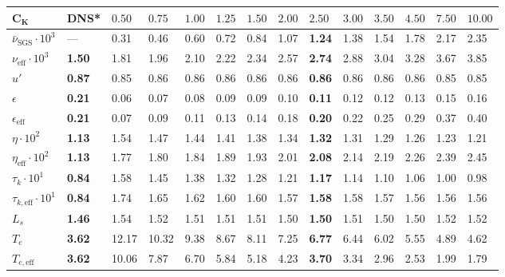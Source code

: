 \documentclass{pracamgren}
\begin{document}
\begin{table}[ht]
\centering
\scriptsize
\begin{tabular}{llllllllllllll}
$\mathbf{C_K}$ & \textbf{DNS}* & $0.50$ & $0.75$ & $1.00$ & $1.25$ & $1.50$ & $2.00$ & $\mathbf{2.50}$ & $3.00$ & $3.50$ & $4.50$ & $7.50$ & $10.00$ \\ \hline

$\bar{\nu}_{\text{SGS}} \cdot 10^3$ & --- & 0.31 & 0.46 & 0.60 & 0.72 & 0.84 & 1.07 & \textbf{1.24} & 1.38 & 1.54 & 1.78 & 2.17 & 2.35 \\
$\nu_{\text{eff}}  \cdot 10^3$ & \textbf{1.50} & 1.81 & 1.96 & 2.10 & 2.22 & 2.34 & 2.57 & \textbf{2.74} & 2.88 & 3.04 & 3.28 & 3.67 & 3.85 \\

$u'$ & \textbf{0.87} & 0.85 & 0.86 & 0.86 & 0.86 & 0.86 & 0.86 & \textbf{0.86} & 0.86 & 0.86 & 0.86 & 0.85 & 0.85 \\

$\epsilon$ & \textbf{0.21} & 0.06 & 0.07 & 0.08 & 0.09 & 0.09 & 0.10 & \textbf{0.11} & 0.12 & 0.12 & 0.13 & 0.15 & 0.16 \\
$\epsilon_{\text{eff}}$ & \textbf{0.21} & 0.07 & 0.09 & 0.11 & 0.13 & 0.14 & 0.18 & \textbf{0.20 } & 0.22 & 0.25 & 0.29 & 0.37 & 0.40 \\ \hline

$\eta \cdot 10^2$ & \textbf{1.13} & 1.54 & 1.47 & 1.44 & 1.41 & 1.38 & 1.34 & \textbf{1.32} & 1.31 & 1.29 & 1.26 & 1.23 & 1.21 \\
$\eta_{\text{eff}} \cdot 10^2$ & \textbf{1.13} & 1.77 & 1.80 & 1.84 & 1.89 & 1.93 & 2.01 & \textbf{2.08} & 2.14 & 2.19 & 2.26 & 2.39 & 2.45 \\

$\tau_k \cdot 10^1$ & \textbf{0.84} & 1.58 & 1.45 & 1.38 & 1.32 & 1.28 & 1.21 & \textbf{1.17} & 1.14 & 1.10 & 1.06 & 1.00 & 0.98 \\
$\tau_{k, \text{eff}} \cdot 10^1$ & \textbf{0.84} & 1.74 & 1.65 & 1.62 & 1.60 & 1.60 & 1.57 & \textbf{1.58} & 1.58 & 1.57 & 1.56 & 1.56 & 1.56 \\ \hline

$L_s$ & \textbf{1.46} & 1.54 & 1.52 & 1.51 & 1.51 & 1.51 & 1.50 & \textbf{1.50} & 1.51 & 1.50 & 1.50 & 1.52 & 1.52 \\
$T_e$ & \textbf{3.62} & 12.17 & 10.32 & 9.38 & 8.67 & 8.11 & 7.25 & \textbf{6.77} & 6.44 & 6.02 & 5.55 & 4.89  & 4.62 \\
$T_{e, \text{eff}}$ & \textbf{3.62} & 10.06 & 7.87 & 6.70 & 5.84 & 5.18 & 4.23 & \textbf{3.70} & 3.34 & 2.96 & 2.53 & 1.99 & 1.79 \\ \hline


\end{tabular}
\end{table}
\end{document}
